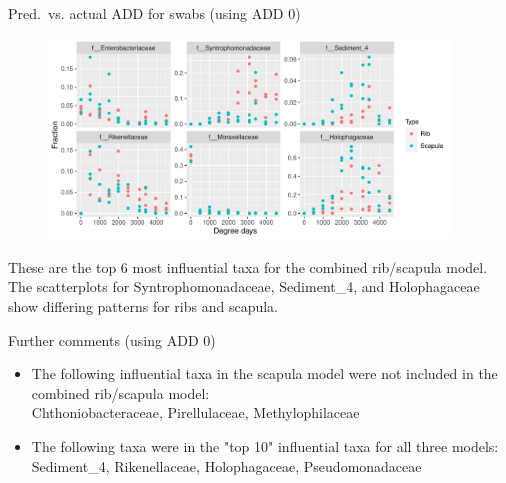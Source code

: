 \documentclass{beamer}
\begin{document}
\begin{frame}{Pred.\ vs. actual ADD for swabs (using ADD 0)}

  \begin{center}
    \begin{figure}
      \includegraphics[height=2.1in]
        {w_swabs/bacteria/use_families/both_ribs_scapulae/w_baseline/infl_combined_swab_w_baseline_family_scatter}
    \end{figure}
  \end{center}

  \vspace{0.15in}

  \footnotesize{ \noindent These are the top 6 most influential taxa for the
    combined rib/scapula model.  The scatterplots for Syntrophomonadaceae,
    Sediment\_4, and Holophagaceae show differing patterns for ribs and
    scapula.
    }

\end{frame}



\begin{frame}{Further comments (using ADD 0)}
  
  \begin{itemize}
    \item The following influential taxa in the scapula model were not included
    in the combined rib/scapula model:\\
    Chthoniobacteraceae, Pirellulaceae, Methylophilaceae
    \item The following taxa were in the "top 10" influential taxa for all
    three models:\\
    Sediment\_4, Rikenellaceae, Holophagaceae, Pseudomonadaceae
  \end{itemize}

\end{frame}
\end{document}
